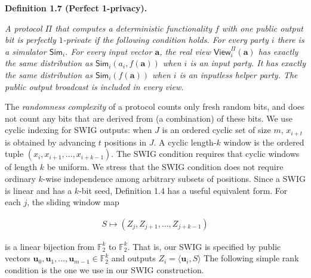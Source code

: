 \documentclass[10pt,a4paper]{article}
\begin{document}


\par\medskip\noindent\textbf{
\textbf{Definition 1.7}\textbf{ }(Perfect 1-privacy)\textbf{.}
}\par



\emph{A protocol $\Pi$ that computes a deterministic functionality $f$ with one public output bit is perfectly $1$-private if the following condition holds. For every party $i$ there is a simulator $\mathsf{Sim}_{i}$. For every input vector $\mathbf{a}$, the real view $\mathsf{View}_{i}^{\Pi}(\mathbf{a})$ has exactly the same distribution as $\mathsf{Sim}_{i}(a_{i},f(\mathbf{a}))$ when $i$ is an input party. It has exactly the same distribution as $\mathsf{Sim}_{i}(f(\mathbf{a}))$ when $i$ is an inputless helper party. The public output broadcast is included in every view.}\par






The \emph{randomness complexity} of a protocol counts only fresh random bits, and does not count any bits that are derived from (a combination) of these bits.
We use cyclic indexing for SWIG outputs: when $J$ is an ordered cyclic set of size $m$, $x_{i+t}$ is obtained by advancing $t$ positions in $J$. A cyclic length-$k$ window is the ordered tuple $(x_{i},x_{i+1},\ldots,x_{i+k-1})$. The SWIG condition requires that cyclic windows of length $k$ be uniform. We stress that the SWIG condition does not require ordinary $k$-wise independence among arbitrary subsets of positions.
Since a SWIG is linear and has a $k$-bit seed, Definition 1.4 has a useful equivalent form. For each $j$, the sliding window map\par


\[\begin{gathered}
S\mapsto(Z_{j},Z_{j+1},\ldots,Z_{j+k-1})
\end{gathered}\]


is a linear bijection from $\mathbb{F}_{2}^{k}$ to $\mathbb{F}_{2}^{k}$.
That is, our SWIG is specified by public vectors $\mathbf{u}_{0},\mathbf{u}_{1},\ldots,\mathbf{u}_{m-1}\in\mathbb{F}_{2}^{k}$ and outputs
$Z_{i}=\langle\mathbf{u}_{i},S\rangle$
The following simple rank condition is the one we use in our SWIG construction.\par
\end{document}
